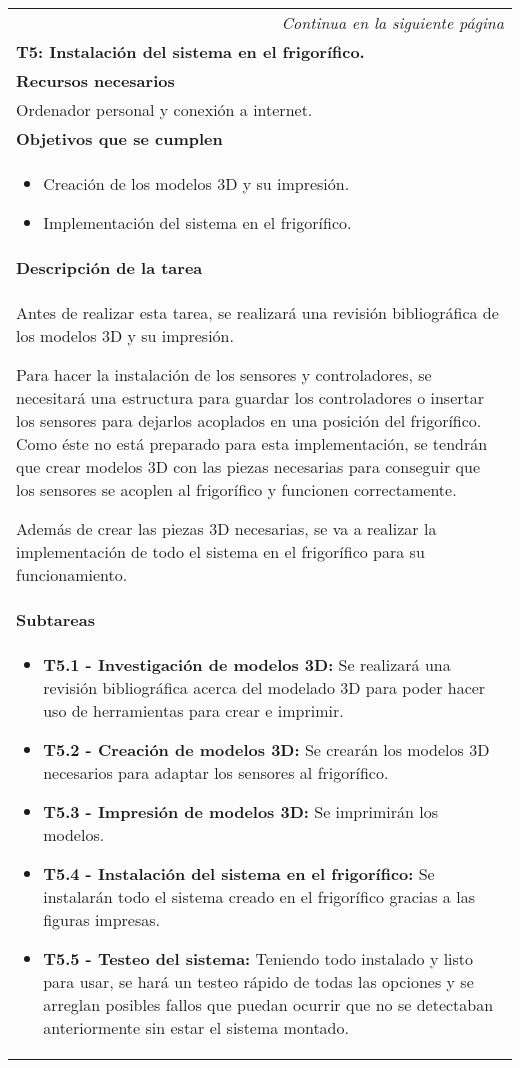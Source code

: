 \begin{longtable}{|p{}|}
\hline
\endfirsthead
\endhead
\hline \multicolumn{1}{r}{\textit{Continua en la siguiente página}} \\
\endfoot
\endlastfoot
    \rowcolor[gray]{.5}
    {\color{white}\textbf{T5: Instalación del sistema en el frigorífico.}} \\
    \hline
    \rowcolor[gray]{.9}
    \textbf{Recursos necesarios} \\
    \hline
    Ordenador personal y conexión a internet. \\
    \hline
    \rowcolor[gray]{.9}
    \textbf{Objetivos que se cumplen} \\
    \hline
    \begin{itemize}
        \item Creación de los modelos 3D y su impresión.
        \item Implementación del sistema en el frigorífico.
    \end{itemize}\\
    \hline
    \rowcolor[gray]{.9}
    \textbf{Descripción de la tarea} \\
    \hline
    Antes de realizar esta tarea, se realizará una revisión bibliográfica de los modelos 3D y su impresión.
    
    Para hacer la instalación de los sensores y controladores, se necesitará una estructura para guardar los controladores o insertar los sensores para dejarlos acoplados en una posición del frigorífico. Como éste no está preparado para esta implementación, se tendrán que crear modelos 3D con las piezas necesarias para conseguir que los sensores se acoplen al frigorífico y funcionen correctamente.
    
    Además de crear las piezas 3D necesarias, se va a realizar la implementación de todo el sistema en el frigorífico para su funcionamiento.\\
    \hline
    \rowcolor[gray]{.9}
    \textbf{Subtareas} \\
    \hline
    \begin{itemize}
        \item \textbf{T5.1 - Investigación de modelos 3D:} Se realizará una revisión bibliográfica acerca del modelado 3D para poder hacer uso de herramientas para crear e imprimir.
        \item \textbf{T5.2 - Creación de modelos 3D:} Se crearán los modelos 3D necesarios para adaptar los sensores al frigorífico.
        \item \textbf{T5.3 - Impresión de modelos 3D:} Se imprimirán los modelos.
        \item \textbf{T5.4 - Instalación del sistema en el frigorífico:} Se instalarán todo el sistema creado en el frigorífico gracias a las figuras impresas.
        \item \textbf{T5.5 - Testeo del sistema:} Teniendo todo instalado y listo para usar, se hará un testeo rápido de todas las opciones y se arreglan posibles fallos que puedan ocurrir que no se detectaban anteriormente sin estar el sistema montado.
    \end{itemize} \\
    \hline
\end{longtable}

